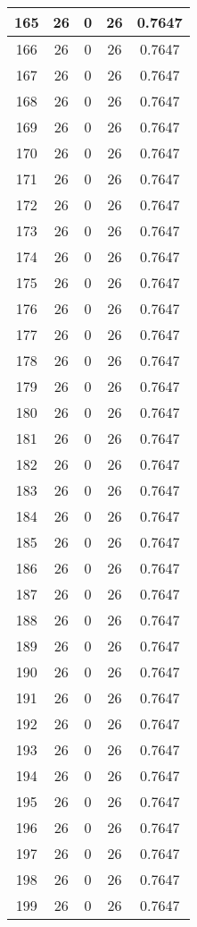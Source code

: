 \documentclass[letterpaper, 12pt]{article}
\begin{document}
\begin{longtable}{|c|c|c|c|c|}
\hline
165 & 26 & 0 & 26 & 0.7647 \\
\hline
166 & 26 & 0 & 26 & 0.7647 \\
\hline
167 & 26 & 0 & 26 & 0.7647 \\
\hline
168 & 26 & 0 & 26 & 0.7647 \\
\hline
169 & 26 & 0 & 26 & 0.7647 \\
\hline
170 & 26 & 0 & 26 & 0.7647 \\
\hline
171 & 26 & 0 & 26 & 0.7647 \\
\hline
172 & 26 & 0 & 26 & 0.7647 \\
\hline
173 & 26 & 0 & 26 & 0.7647 \\
\hline
174 & 26 & 0 & 26 & 0.7647 \\
\hline
175 & 26 & 0 & 26 & 0.7647 \\
\hline
176 & 26 & 0 & 26 & 0.7647 \\
\hline
177 & 26 & 0 & 26 & 0.7647 \\
\hline
178 & 26 & 0 & 26 & 0.7647 \\
\hline
179 & 26 & 0 & 26 & 0.7647 \\
\hline
180 & 26 & 0 & 26 & 0.7647 \\
\hline
181 & 26 & 0 & 26 & 0.7647 \\
\hline
182 & 26 & 0 & 26 & 0.7647 \\
\hline
183 & 26 & 0 & 26 & 0.7647 \\
\hline
184 & 26 & 0 & 26 & 0.7647 \\
\hline
185 & 26 & 0 & 26 & 0.7647 \\
\hline
186 & 26 & 0 & 26 & 0.7647 \\
\hline
187 & 26 & 0 & 26 & 0.7647 \\
\hline
188 & 26 & 0 & 26 & 0.7647 \\
\hline
189 & 26 & 0 & 26 & 0.7647 \\
\hline
190 & 26 & 0 & 26 & 0.7647 \\
\hline
191 & 26 & 0 & 26 & 0.7647 \\
\hline
192 & 26 & 0 & 26 & 0.7647 \\
\hline
193 & 26 & 0 & 26 & 0.7647 \\
\hline
194 & 26 & 0 & 26 & 0.7647 \\
\hline
195 & 26 & 0 & 26 & 0.7647 \\
\hline
196 & 26 & 0 & 26 & 0.7647 \\
\hline
197 & 26 & 0 & 26 & 0.7647 \\
\hline
198 & 26 & 0 & 26 & 0.7647 \\
\hline
199 & 26 & 0 & 26 & 0.7647 \\
\hline
\end{longtable}
\end{document}
